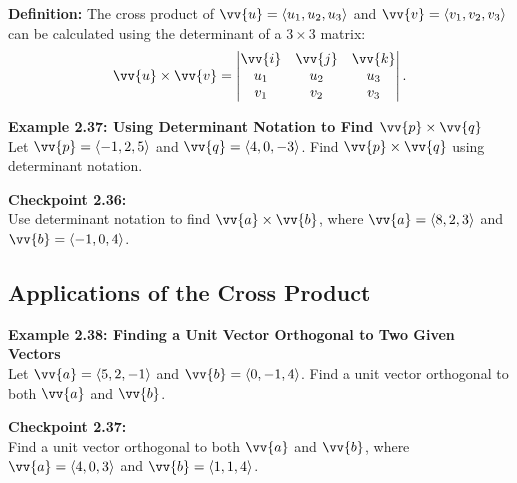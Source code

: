 \documentclass{article}
\begin{document}
\begin{definitionbox}
    \textbf{Definition:} The cross product of \(\vv{u} = \langle u_1, u_2, u_3 \rangle\) and \(\vv{v} = \langle v_1, v_2, v_3 \rangle\) can be calculated using the determinant of a \(3 \times 3\) matrix:
    \[
    \vv{u} \times \vv{v} = \begin{vmatrix}
    \vv{i} & \vv{j} & \vv{k} \\
    u_1 & u_2 & u_3 \\
    v_1 & v_2 & v_3
    \end{vmatrix}.
    \]
\end{definitionbox}

\begin{examplebox}
    \textbf{Example 2.37: Using Determinant Notation to Find \(\vv{p} \times \vv{q}\)} \\
    Let \(\vv{p} = \langle -1, 2, 5 \rangle\) and \(\vv{q} = \langle 4, 0, -3 \rangle\). Find \(\vv{p} \times \vv{q}\) using determinant notation.
\end{examplebox}

\begin{exercisebox}
    \textbf{Checkpoint 2.36:} \\
    Use determinant notation to find \(\vv{a} \times \vv{b}\), where \(\vv{a} = \langle 8, 2, 3 \rangle\) and \(\vv{b} = \langle -1, 0, 4 \rangle\).
\end{exercisebox}

\subsection*{Applications of the Cross Product}

\begin{examplebox}
    \textbf{Example 2.38: Finding a Unit Vector Orthogonal to Two Given Vectors} \\
    Let \(\vv{a} = \langle 5, 2, -1 \rangle\) and \(\vv{b} = \langle 0, -1, 4 \rangle\). Find a unit vector orthogonal to both \(\vv{a}\) and \(\vv{b}\).
\end{examplebox}

\begin{exercisebox}
    \textbf{Checkpoint 2.37:} \\
    Find a unit vector orthogonal to both \(\vv{a}\) and \(\vv{b}\), where \(\vv{a} = \langle 4, 0, 3 \rangle\) and \(\vv{b} = \langle 1, 1, 4 \rangle\).
\end{exercisebox}
\end{document}

